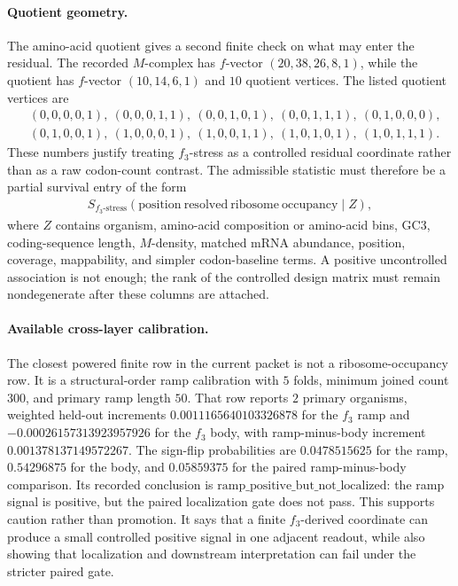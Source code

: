 \paragraph{Quotient geometry.}
The amino-acid quotient gives a second finite check on what may enter the residual. The recorded $M$-complex has $f$-vector $(20,38,26,8,1)$, while the quotient has $f$-vector $(10,14,6,1)$ and $10$ quotient vertices. The listed quotient vertices are
$$
\begin{aligned}
&(0,0,0,0,1),\ (0,0,0,1,1),\ (0,0,1,0,1),\ (0,0,1,1,1),\ (0,1,0,0,0),\\
&(0,1,0,0,1),\ (1,0,0,0,1),\ (1,0,0,1,1),\ (1,0,1,0,1),\ (1,0,1,1,1).
\end{aligned}
$$
These numbers justify treating $f_3$-stress as a controlled residual coordinate rather than as a raw codon-count contrast. The admissible statistic must therefore be a partial survival entry of the form
$$
\begin{aligned}
S_{f_3\text{-stress}}(\mathrm{position\ resolved\ ribosome\ occupancy}\mid Z),
\end{aligned}
$$
where $Z$ contains organism, amino-acid composition or amino-acid bins, GC3, coding-sequence length, $M$-density, matched mRNA abundance, position, coverage, mappability, and simpler codon-baseline terms. A positive uncontrolled association is not enough; the rank of the controlled design matrix must remain nondegenerate after these columns are attached.

\paragraph{Available cross-layer calibration.}
The closest powered finite row in the current packet is not a ribosome-occupancy row. It is a structural-order ramp calibration with $5$ folds, minimum joined count $300$, and primary ramp length $50$. That row reports $2$ primary organisms, weighted held-out increments $0.0011165640103326878$ for the $f_3$ ramp and $-0.00026157313923957926$ for the $f_3$ body, with ramp-minus-body increment $0.001378137149572267$. The sign-flip probabilities are $0.0478515625$ for the ramp, $0.54296875$ for the body, and $0.05859375$ for the paired ramp-minus-body comparison. Its recorded conclusion is $\mathrm{ramp\_positive\_but\_not\_localized}$: the ramp signal is positive, but the paired localization gate does not pass. This supports caution rather than promotion. It says that a finite $f_3$-derived coordinate can produce a small controlled positive signal in one adjacent readout, while also showing that localization and downstream interpretation can fail under the stricter paired gate.

